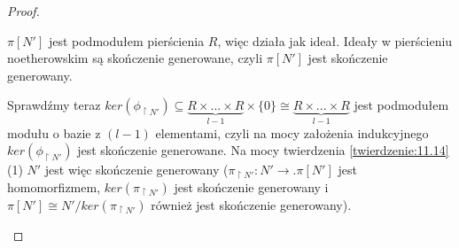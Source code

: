 \begin{proof}
\begin{itemize}[leftmargin=19mm]
\begin{itemize}
          \begin{center}
          \end{center}

          $\pi[N']$ jest podmodułem pierścienia $R$, więc działa jak ideał. Ideały w pierścieniu noetherowskim są skończenie generowane, czyli $\pi[N']$ jest skończenie generowany.

          Sprawdźmy teraz $ker(\phi_{\restriction N'})\subseteq \underbrace{R\times ...\times R}_{l-1}\times\{0\}\cong \underbrace{R\times...\times R}_{l-1}$ jest podmodułem modułu o bazie z $(l-1)$ elementami, czyli na mocy założenia indukcyjnego $ker(\phi_{\restriction N'})$ jest skończenie generowane. Na mocy twierdzenia \ref{twierdzenie:11.14}(1) $N'$ jest więc skończenie generowany ($\pi_{\restriction N'}:N'\to .\pi[N']$ jest homomorfizmem, $ker(\pi_{\restriction N'})$ jest skończenie generowany i $\pi[N']\cong N'/ ker(\pi_{\restriction N'})$ również jest skończenie generowany).
      \end{itemize}
  \end{itemize}
\end{proof}

